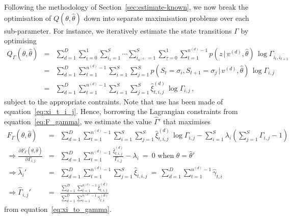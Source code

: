 \documentclass[a4paper]{article}
\newcommand{\ui}{\underline{\iota}}
\newcommand{\ut}{\underline{\tau}}
\begin{document}
Following the methodology of Section~\ref{sec:estimate-known}, we now break the optimisation of $Q(\theta,\hat{\theta})$
down into separate maximisation problems over each sub-parameter.
For instance, we iteratively estimate the state transitions $\Gamma$ by optimising
\begin{eqnarray}
  Q_{\Gamma}(\theta,\hat{\theta}) & = & 
\sum_{d=1}^D
\sum_{\overline{\ui}=0}^{1}\sum_{\overline{i_1}=1}^{S}\cdots\sum_{\overline{i_{n^{(d)}}}=1}^{S}
\sum_{\overline{\ut}=0}^{1}
\sum_{t=1}^{n^{(d)}-1}p(z\,|\,v^{(d)},\hat{\theta})\,\log\Gamma_{\overline{i_t},\overline{i_{t+1}}}
\nonumber\\& = &
\sum_{d=1}^D\sum_{t=1}^{n^{(d)}-1}
\sum_{i=1}^{S}\sum_{j=1}^{S}
p(S_t\!=\!\sigma_{i},S_{t+1}\!=\!\sigma_j\,|\,v^{(d)},\hat{\theta})\,\log\Gamma_{i,j}
\nonumber\\& = &
\sum_{d=1}^D\sum_{t=1}^{n^{(d)}-1}
\sum_{i=1}^{S}\sum_{j=1}^{S}
\hat{\xi}_{t,i,j}^{(d)}\,\log\Gamma_{i,j}
\,,
\end{eqnarray}
subject to the appropriate contraints. Note that use has been made of equation~\eqref{eq:xi_t_i_j}.
Hence, borrowing the Lagrangian constraints from equation~\eqref{eq:F_gamma}, we estimate the value $\hat{\Gamma}'$ that maximises
\begin{eqnarray}
  F_{\Gamma}(\theta,\hat{\theta}) & = & 
\sum_{d=1}^D\sum_{t=1}^{n^{(d)}-1}
\sum_{i=1}^{S}\sum_{j=1}^{S}
\hat{\xi}_{t,i,j}^{(d)}\,\log\Gamma_{i,j}
-\sum_{i=1}^{S}\lambda_i\left(\sum_{j=1}^{S}\Gamma_{i,j}-1\right)
\\
\Rightarrow
  \frac{\partial F_{\Gamma}(\theta,\hat{\theta})}{\partial\Gamma_{i,j}} & = & 
\sum_{d=1}^D\sum_{t=1}^{n^{(d)}-1}\frac{\hat{\xi}_{t,i,j}^{(d)}}{\Gamma_{i,j}}-\lambda_i
~=~0 \mbox{ when }\theta=\hat{\theta}'
\nonumber\\
\Rightarrow \hat{\lambda}_{i}' & = & \sum_{d=1}^D\sum_{t=1}^{n^{(d)}-1}\sum_{j=1}^{S}\hat{\xi}_{t,i,j}~=~\sum_{d=1}^D\sum_{t=1}^{n^{(d)}-1}\hat{\gamma}_{t,i}
\nonumber\\
\Rightarrow \hat{\Gamma}_{i,j}' & = & 
  \frac{\sum_{d=1}^D\sum_{t=1}^{n^{(d)}-1} \hat{\xi}_{t,i,j}^{(d)}}
          {\sum_{d=1}^D\sum_{t=1}^{n^{(d)}-1} \hat{\gamma}_{t,i}^{(d)}}
\end{eqnarray}
from equation~\eqref{eq:xi_to_gamma}. 
\end{document}
